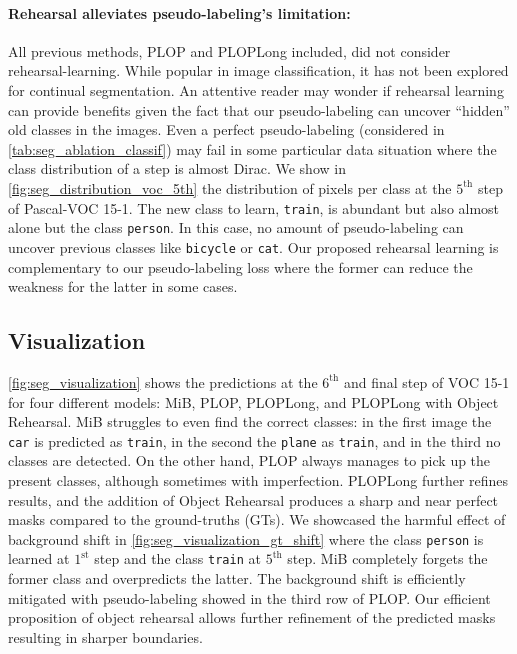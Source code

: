 \paragraph{Rehearsal alleviates pseudo-labeling's limitation:} All previous methods, PLOP
and PLOPLong included, did not consider rehearsal-learning. While popular in image classification, it
has not been explored for continual segmentation. An attentive reader may wonder if rehearsal
learning can provide benefits given the fact that our pseudo-labeling can uncover ``hidden'' old classes
in the images. Even a perfect pseudo-labeling (considered in \autoref{tab:seg_ablation_classif}) may
fail in some particular data situation where the class distribution of a step is almost Dirac. We
show in \autoref{fig:seg_distribution_voc_5th} the distribution of pixels per class at the
$5^{\text{th}}$ step of Pascal-VOC 15-1. The new class to learn, \texttt{train}, is abundant but
also almost alone but the class \texttt{person}. In this case, no amount of pseudo-labeling can
uncover previous classes like \texttt{bicycle} or \texttt{cat}. Our proposed rehearsal learning is
complementary to our pseudo-labeling loss where the former can reduce the weakness for the latter in
some cases.

\subsection{Visualization}

\autoref{fig:seg_visualization} shows the predictions at the $6^\text{th}$ and final step of VOC
15-1 for four different models: MiB, PLOP, PLOPLong, and PLOPLong with Object Rehearsal. MiB
struggles to even find the correct classes: in the first image the \texttt{car} is predicted as
\texttt{train}, in the second the \texttt{plane} as \texttt{train}, and in the third no classes are
detected. On the other hand, PLOP always manages to pick up the present classes, although sometimes
with imperfection. PLOPLong further refines results, and the addition of Object Rehearsal produces a
sharp and near perfect masks compared to the ground-truths (GTs). We showcased the harmful effect of
background shift in \autoref{fig:seg_visualization_gt_shift} where the class \texttt{person} is
learned at $1^\text{st}$ step and the class \texttt{train} at $5^\text{th}$ step. MiB completely
forgets the former class and overpredicts the latter. The background shift is efficiently mitigated
with pseudo-labeling showed in the third row of PLOP. Our efficient proposition of object
rehearsal allows further refinement of the predicted masks resulting in sharper boundaries.

